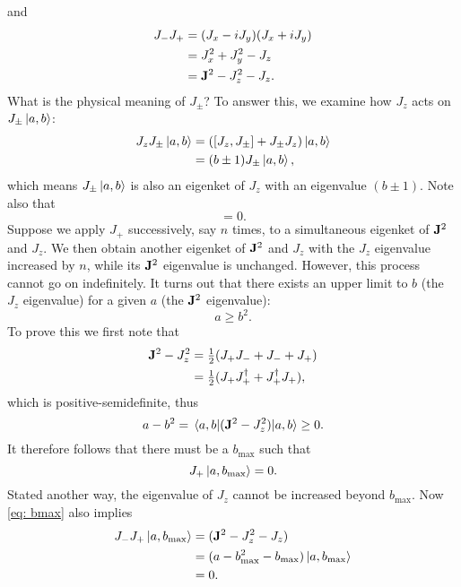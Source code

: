 \documentclass[10pt]{article}
\begin{document}
	and
	\begin{align*}
		J_{-} J_{+} &= (J_x - i J_y) (J_x + i J_y) \\
		&= J_x^2 + J_y^2  - J_z \\
		&= {\bf J}^2 - J_z^2 - J_z.
	\end{align*}
	What is the physical meaning of $J_{\pm}$? To answer this, we examine how $J_z$ acts on $J_{\pm} \ket{a,b}$:
	\begin{align*}
		J_z J_{\pm} \ket{a,b} &= ([J_z, J_{\pm}] + J_{\pm} J_z) \ket{a,b} \\
		&= (b \pm 1) J_{\pm} \ket{a,b},
	\end{align*}
	which means $J_{\pm} \ket{a,b}$ is also an eigenket of $J_z$ with an eigenvalue $(b \pm 1)$. Note also that
	\begin{equation}
		[\bfJ^2, J_{\pm}] = 0.
	\end{equation}
	Suppose we apply $J_+$ successively, say $n$ times, to a simultaneous eigenket of ${\bf J}^2$ and $J_z$. We then obtain another eigenket of ${\bf J}^2$ and $J_z$ with the $J_z$ eigenvalue increased by $n$, while its ${\bf J}^2$ eigenvalue is unchanged. However, this process cannot go on indefinitely. It turns out that there exists an upper limit to $b$ (the $J_z$ eigenvalue) for a given $a$ (the ${\bf J}^2$ eigenvalue):
	\begin{equation}
		a \ge b^2. \label{eq: upper limit to b}
	\end{equation}
	To prove this we first note that
	\begin{align*}
		{\bf J}^2 - J_z^2 &= \tfrac{1}{2} (J_+ J_- + J_- + J_+) \\
		&= \tfrac{1}{2} (J_+ J_+^{\dagger} + J_+^{\dagger} J_+),
	\end{align*}
	which is positive-semidefinite, thus
	\begin{equation}
		a - b^2 = \ev{(\bfJ^2 - J_z^2)}{a,b} \ge 0.
	\end{equation}
	It therefore follows that there must be a $b_{\max}$ such that
	\begin{equation}
		J_+ \ket{a, b_{\max}} = 0. \label{eq: bmax}
	\end{equation}
	Stated another way, the eigenvalue of $J_z$ cannot be increased beyond $b_{\max}$. Now \eqref{eq: bmax} also implies
	\begin{align*}
		J_- J_+ \ket{a, b_{\max}} &= ({\bf J}^2 - J_z^2 - J_z) \\
		&= (a - b_{\max}^2 - b_{\max}) \ket{a, b_{\max}}\\
		&= 0.
	\end{align*}
\end{document}

